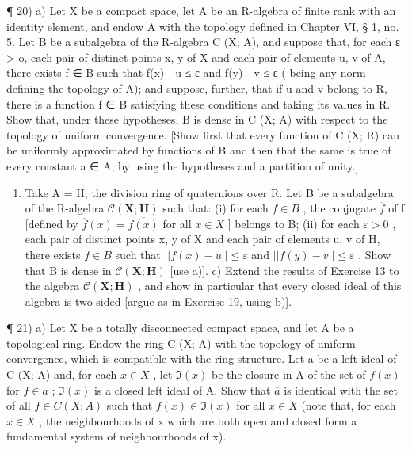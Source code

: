 ¶ 20) a) Let X be a compact space, let A be an R-algebra of finite rank with an identity element, and endow A with the topology defined in Chapter VI, § 1, no. 5. Let B be a subalgebra of the R-algebra C (X; A), and suppose that, for each ε \textgreater{} o, each pair of distinct points x, y of X and each pair of elements u, v of A, there exists f ∈ B such that \textbar\textbar f(x) - u\textbar\textbar{} ≤ ε and \textbar\textbar f(y) - v\textbar\textbar{} ≤ ε (\textbar\textbar{} \textbar\textbar{} being any norm defining the topology of A); and suppose, further, that if u and v belong to R, there is a function f ∈ B satisfying these conditions and taking its values in R. Show that, under these hypotheses, B is dense in C (X; A) with respect to the topology of uniform convergence. {[}Show first that every function of C (X; R) can be uniformly approximated by functions of B and then that the same is true of every constant a ∈ A, by using the hypotheses and a partition of unity.{]}

\begin{enumerate}
\def\labelenumi{\alph{enumi})}
\setcounter{enumi}{1}
\tightlist
\item
  Take A = H, the division ring of quaternions over R. Let B be a subalgebra of the R-algebra \(\mathcal{C}(\mathbf{X}; \mathbf{H})\) such that: (i) for each \(f \in B\) , the conjugate \(\overline{f}\) of f {[}defined by \(\overline{f}(x) = \overline{f(x)}\) for all \(x \in X\) {]} belongs to B; (ii) for each \(\varepsilon > 0\) , each pair of distinct points x, y of X and each pair of elements u, v of H, there exists \(f \in B\) such that \(||f(x) - u|| \leqslant \varepsilon\) and \(||f(y) - v|| \leqslant \varepsilon\) . Show that B is dense in \(\mathcal{C}(\mathbf{X}; \mathbf{H})\) {[}use a){]}. c) Extend the results of Exercise 13 to the algebra \(\mathcal{C}(\mathbf{X}; \mathbf{H})\) , and show in particular that every closed ideal of this algebra is two-sided {[}argue as in Exercise 19, using b){]}.
\end{enumerate}

¶ 21) a) Let X be a totally disconnected compact space, and let A be a topological ring. Endow the ring C (X; A) with the topology of uniform convergence, which is compatible with the ring structure. Let a be a left ideal of C (X; A) and, for each \(x \in X\) , let \(\Im(x)\) be the closure in A of the set of \(f(x)\) for \(f \in a\) ; \(\Im(x)\) is a closed left ideal of A. Show that \(\overline{a}\) is identical with the set of all \(f \in C(X; A)\) such that \(f(x) \in \Im(x)\) for all \(x \in X\) (note that, for each \(x \in X\) , the neighbourhoods of x which are both open and closed form a fundamental system of neighbourhoods of x).

